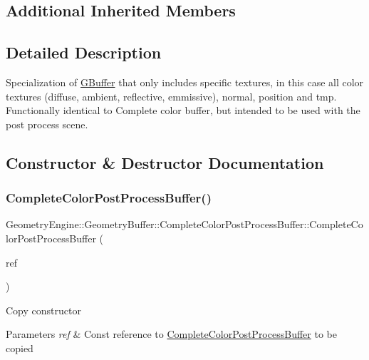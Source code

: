 \subsection*{Additional Inherited Members}


\subsection{Detailed Description}
Specialization of \mbox{\hyperlink{class_geometry_engine_1_1_geometry_buffer_1_1_g_buffer}{G\+Buffer}} that only includes specific textures, in this case all color textures (diffuse, ambient, reflective, emmissive), normal, position and tmp. Functionally identical to Complete color buffer, but intended to be used with the post process scene. 

\subsection{Constructor \& Destructor Documentation}
\mbox{\label{class_geometry_engine_1_1_geometry_buffer_1_1_complete_color_post_process_buffer_a7cce9b235baaf2d45b0a6e23c80a46e8}} 
\subsubsection{\texorpdfstring{CompleteColorPostProcessBuffer()}{CompleteColorPostProcessBuffer()}}
{\footnotesize\ttfamily Geometry\+Engine\+::\+Geometry\+Buffer\+::\+Complete\+Color\+Post\+Process\+Buffer\+::\+Complete\+Color\+Post\+Process\+Buffer (\begin{DoxyParamCaption}\item[{const \mbox{\hyperlink{class_geometry_engine_1_1_geometry_buffer_1_1_complete_color_post_process_buffer}{Complete\+Color\+Post\+Process\+Buffer}} \&}]{ref }\end{DoxyParamCaption})}

Copy constructor 
\begin{DoxyParams}{Parameters}
{\em ref} & Const reference to \mbox{\hyperlink{class_geometry_engine_1_1_geometry_buffer_1_1_complete_color_post_process_buffer}{Complete\+Color\+Post\+Process\+Buffer}} to be copied \\
\hline
\end{DoxyParams}


